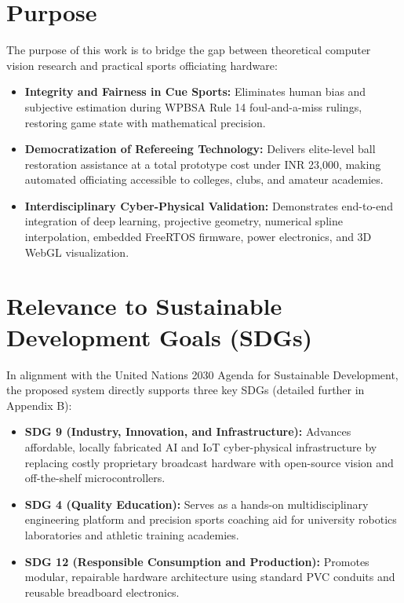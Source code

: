 \section{Purpose}
The purpose of this work is to bridge the gap between theoretical computer vision research and practical sports officiating hardware:
\begin{itemize}
    \item \textbf{Integrity and Fairness in Cue Sports:} Eliminates human bias and subjective estimation during WPBSA Rule 14 foul-and-a-miss rulings, restoring game state with mathematical precision.
    \item \textbf{Democratization of Refereeing Technology:} Delivers elite-level ball restoration assistance at a total prototype cost under INR 23,000, making automated officiating accessible to colleges, clubs, and amateur academies.
    \item \textbf{Interdisciplinary Cyber-Physical Validation:} Demonstrates end-to-end integration of deep learning, projective geometry, numerical spline interpolation, embedded FreeRTOS firmware, power electronics, and 3D WebGL visualization.
\end{itemize}

\section{Relevance to Sustainable Development Goals (SDGs)}
In alignment with the United Nations 2030 Agenda for Sustainable Development, the proposed system directly supports three key SDGs (detailed further in Appendix B):
\begin{itemize}
    \item \textbf{SDG 9 (Industry, Innovation, and Infrastructure):} Advances affordable, locally fabricated AI and IoT cyber-physical infrastructure by replacing costly proprietary broadcast hardware with open-source vision and off-the-shelf microcontrollers.
    \item \textbf{SDG 4 (Quality Education):} Serves as a hands-on multidisciplinary engineering platform and precision sports coaching aid for university robotics laboratories and athletic training academies.
    \item \textbf{SDG 12 (Responsible Consumption and Production):} Promotes modular, repairable hardware architecture using standard PVC conduits and reusable breadboard electronics.
\end{itemize}

